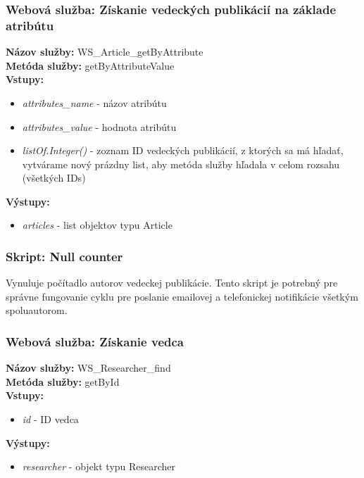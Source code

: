 \documentclass[10pt,oneside,slovak,a4paper]{article}
\begin{document}
\subsubsection{Webová služba: Získanie vedeckých publikácií na základe atribútu}
\textbf{Názov služby:} WS\_Article\_getByAttribute\\
\textbf{Metóda služby:} getByAttributeValue\\
\textbf{Vstupy:}
	\begin{itemize}
		\item \textit{attributes\_name} - názov atribútu
		\item \textit{attributes\_value} - hodnota atribútu
		\item \textit{listOf.Integer()} - zoznam ID vedeckých publikácií, z ktorých sa má hľadať, vytvárame nový prázdny list, aby metóda služby hľadala v celom rozsahu (všetkých IDs)
	\end{itemize}
\textbf{Výstupy:}
	\begin{itemize}
		\item \textit{articles} - list objektov typu Article
	\end{itemize}

\subsubsection{Skript: Null counter}
Vynuluje počítadlo autorov vedeckej publikácie. Tento skript je potrebný pre správne fungovanie cyklu pre poslanie emailovej a telefonickej notifikácie všetkým spoluautorom.

\subsubsection{Webová služba: Získanie vedca}
\textbf{Názov služby:} WS\_Researcher\_find\\
\textbf{Metóda služby:} getById\\
\textbf{Vstupy:}
	\begin{itemize}
		\item \textit{id} - ID vedca
	\end{itemize}
\textbf{Výstupy:}
	\begin{itemize}
		\item \textit{researcher} - objekt typu Researcher
	\end{itemize}
\end{document}
